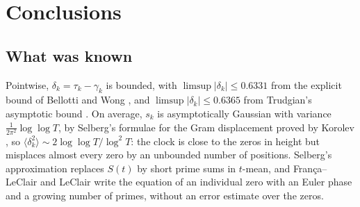 \section{Conclusions}
\label{sec:conclusions}

\subsection{What was known}
Pointwise, $\delta_k=\tau_k-\gamma_k$ is bounded, with $\limsup|\delta_k|\le0.6331$ from the explicit bound of Bellotti and Wong \cite{BellottiWong2025}, and $\limsup|\delta_k|\le0.6365$ from Trudgian's asymptotic bound \cite{Trudgian2010}. On average, $s_k$ is asymptotically Gaussian with variance $\frac1{2\pi^2}\log\log T$, by Selberg's formulae for the Gram displacement proved by Korolev \cite{Korolev2012,Korolev2011}, so $\langle\delta_k^2\rangle\sim2\log\log T/\log^2T$: the clock is close to the zeros in height but misplaces almost every zero by an unbounded number of positions. Selberg's approximation \cite{Selberg1946a,Fujii1974} replaces $S(t)$ by short prime sums in $t$-mean, and Fran\c{c}a--LeClair and LeClair \cite{FrancaLeClair2015,LeClair2021,FrancaLeClair2024} write the equation of an individual zero with an Euler phase and a growing number of primes, without an error estimate over the zeros.

